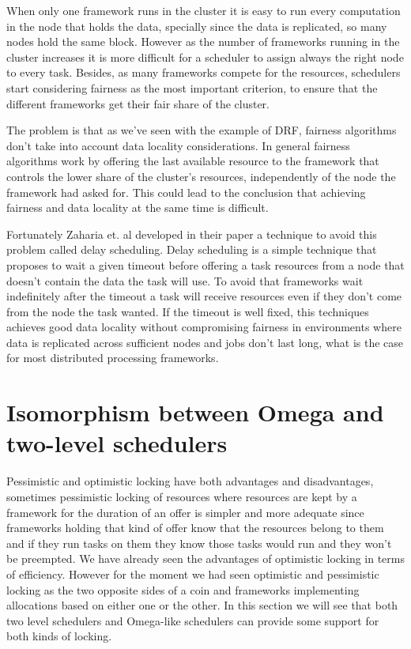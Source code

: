 \documentclass{report}                     %
\begin{document}
When only one framework runs in the cluster it is easy to run every
computation in the node that holds the data, specially since the data
is replicated, so many nodes hold the same block. However as
the number of frameworks running in the cluster increases it is more
difficult for a scheduler to assign always the right node to every
task. Besides, as many frameworks compete for the resources, schedulers
start considering fairness as the most important criterion, to ensure
that the different frameworks get their fair share of the cluster.

The problem is that as we've seen with the example of DRF, fairness
algorithms don't take into account data locality considerations. In
general fairness algorithms work by offering the last available
resource to the framework that controls the lower share of the cluster's
resources, independently of the node the framework had asked for. This
could lead to the conclusion that achieving fairness and data locality
at the same time is difficult.

Fortunately Zaharia et. al developed in their paper
\cite{zaharia_delay_2010} a technique to avoid this problem called
delay scheduling. Delay scheduling is a simple technique that proposes
to wait a given timeout before offering a task resources from a node
that doesn't contain the data the task will use. To avoid that
frameworks wait indefinitely after the timeout a task will receive
resources even if they don't come from the node the task wanted. If
the timeout is well fixed, this techniques achieves good data locality
without compromising fairness in environments where data is replicated
across sufficient nodes and jobs don't last long, what is the case for
most distributed processing frameworks.



\section {Isomorphism between Omega and two-level schedulers}
\label{sec:mixed}

Pessimistic and optimistic locking have both advantages and
disadvantages, sometimes pessimistic locking of resources where
resources are kept by a framework for the duration of an offer is
simpler and more adequate since frameworks holding that kind of offer
know that the resources belong to them and if they run tasks on them
they know those tasks would run and they won't be preempted. We have
already seen the advantages of optimistic locking in terms of
efficiency. However for the moment we had seen optimistic and
pessimistic locking as the two opposite sides of a coin and frameworks
implementing allocations based on either one or the other. In this
section we will see that both two level schedulers and Omega-like
schedulers can provide some support for both kinds of locking.
\end{document}
